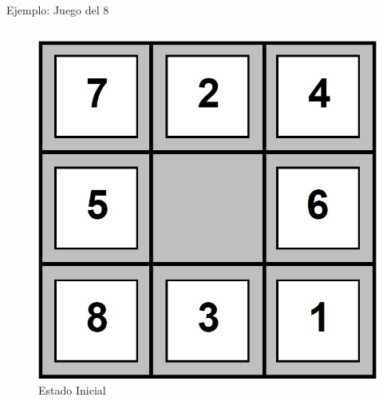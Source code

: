 \documentclass{beamer}
\theoremstyle{definition}
\theoremstyle{theorem}
\theoremstyle{remark}
\begin{document}
\begin{frame}{Ejemplo: Juego del 8}
	\begin{columns}
		\begin{column}{0.5\textwidth}		
			\begin{figure}[h!]
				\includegraphics[scale=.15]{21_grid1.JPG}
				\\
				\vspace{0pt}
				{\tiny Estado Inicial}
			\end{figure}
		\end{column}
		

\end{columns}
\end{frame}
\end{document}
